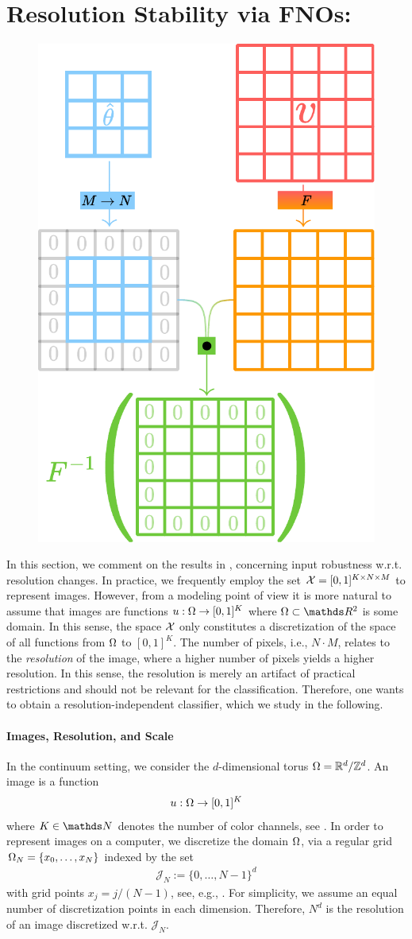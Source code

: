 \section{Resolution Stability via FNOs: \cite{kabri2023resolution}}\label{sec:FNO}
%
\setlength\intextsep{0pt}
\begin{figure}
\centering
\includegraphics[width=.4\textwidth]{atelier/FNO/trigo.pdf}
\end{figure}
%
In this section, we comment on the results in \cite{kabri2023resolution}, concerning input robustness w.r.t. resolution changes. In practice, we frequently employ the set $\mathcal{X}=[0,1]^{K\times N\times M}$ to represent images. However, from a modeling point of view it is more natural to assume that images are functions $u:\Omega\to[0,1]^K$ where $\domain\subset\R^2$ is some domain. In this sense, the space $\mathcal{X}$ only constitutes a discretization of the space of all functions from $\Omega$ to $[0,1]^K$. The number of pixels, i.e., $N\cdot M$, relates to the \emph{resolution} of the image, where a higher number of pixels yields a higher resolution. In this sense, the resolution is merely an artifact of practical restrictions and should not be relevant for the classification. Therefore, one wants to obtain a resolution-independent classifier, which we study in the following.
%
\paragraph{Images, Resolution, and Scale}
%
%
In the continuum setting, we consider the $d$-dimensional torus $\Omega = \mathbb{R}^d / \mathbb{Z}^d$. An image is a function 
%
\begin{align*}
u:\Omega\to[0,1]^K
\end{align*}
%
where $K\in\N$ denotes the number of color channels, see \cite{gonzales1987digital}. In order to represent images on a computer, we discretize the domain $\Omega$, via a regular grid $\Omega_N = \{x_0,\ldots,x_N\}$ indexed by the set
%
\begin{align*}
\mathcal{J}_N := \{0,\ldots, N-1\}^d
\end{align*}
%
with grid points $x_j = j/(N-1)$, see, e.g., \cite{kabri2022FNO, kovachki2021universal}. For simplicity, we assume an equal number of discretization points in each dimension. Therefore, $N^d$ is the resolution of an image discretized w.r.t. $\mathcal{J}_N$.

